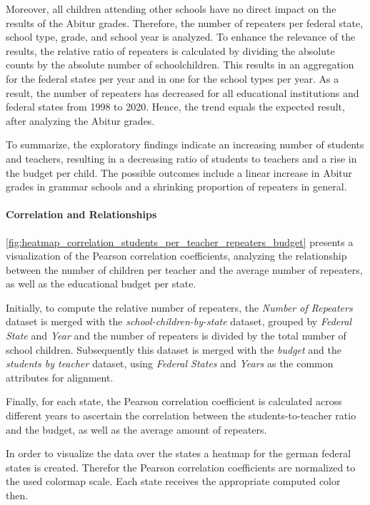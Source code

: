 Moreover, all children attending other schools have no direct impact on the results of the Abitur grades. Therefore, the number of repeaters per federal state, school type, grade, and school year is analyzed. To enhance the relevance of the results, the relative ratio of repeaters is calculated by dividing the absolute counts by the absolute number of schoolchildren. This results in an aggregation for the federal states per year and in one for the school types per year. As a result, the number of repeaters has decreased for all educational institutions and federal states from 1998 to 2020. Hence, the trend equals the expected result, after analyzing the Abitur grades.

To summarize, the exploratory findings indicate an increasing number of students and teachers, resulting in a decreasing ratio of students to teachers and a rise in the budget per child. The possible outcomes include a linear increase in Abitur grades in grammar schools and a shrinking proportion of repeaters in general.

\paragraph{Correlation and Relationships}
\autoref{fig:heatmap_correlation_students_per_teacher_repeaters_budget} presents a visualization of the Pearson correlation coefficients, analyzing the relationship between the number of children per teacher and the average number of repeaters, as well as the educational budget per state. 

Initially, to compute the relative number of repeaters, the \textit{Number of Repeaters} dataset is merged with the \textit{school-children-by-state} dataset, grouped by \textit{Federal State} and \textit{Year} and the number of repeaters is divided by the total number of school children. Subsequently this dataset is merged with the \textit{budget} and the \textit{students by teacher} dataset, using \textit{Federal States} and \textit{Years} as the common attributes for alignment. 

Finally, for each state, the Pearson correlation coefficient is calculated across different years to ascertain the correlation between the students-to-teacher ratio and the budget, as well as the average amount of repeaters.

In order to visualize the data over the states a heatmap for the german federal states is created. Therefor the Pearson correlation coefficients are normalized to the used colormap scale. Each state receives the appropriate computed color then.

